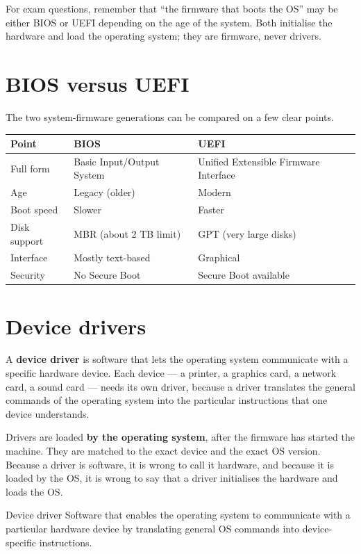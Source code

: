 For exam questions, remember that ``the firmware that boots the OS'' may be
either BIOS or UEFI depending on the age of the system. Both initialise the
hardware and load the operating system; they are firmware, never drivers.

\section{BIOS versus UEFI}
The two system-firmware generations can be compared on a few clear points.

\begin{center}
\begin{tabular}{p{}p{}p{}}
\toprule
\textbf{Point} & \textbf{BIOS} & \textbf{UEFI} \\
\midrule
Full form & Basic Input/Output System & Unified Extensible Firmware Interface \\
Age & Legacy (older) & Modern \\
Boot speed & Slower & Faster \\
Disk support & MBR (about 2 TB limit) & GPT (very large disks) \\
Interface & Mostly text-based & Graphical \\
Security & No Secure Boot & Secure Boot available \\
\bottomrule
\end{tabular}
\end{center}

\section{Device drivers}
A \textbf{device driver} is software that lets the operating system
communicate with a specific hardware device. Each device --- a printer, a
graphics card, a network card, a sound card --- needs its own driver, because
a driver translates the general commands of the operating system into the
particular instructions that one device understands.

Drivers are loaded \textbf{by the operating system}, after the firmware has
started the machine. They are matched to the exact device and the exact OS
version. Because a driver is software, it is wrong to call it hardware, and
because it is loaded by the OS, it is wrong to say that a driver initialises
the hardware and loads the OS.

\begin{definitionbox}{Device driver}
Software that enables the operating system to communicate with a particular
hardware device by translating general OS commands into device-specific
instructions.
\end{definitionbox}

